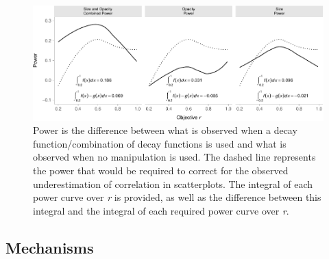 \documentclass[sigconf]{acmart}
\begin{document}
\begin{figure}

{\centering \includegraphics[width=1\textwidth,height=\textheight]{size_and_opacity_files/figure-pdf/fig-power-plot-1.pdf}

}

\caption{\label{fig-power-plot}Power is the difference between what is
observed when a decay function/combination of decay functions is used
and what is observed when no manipulation is used. The dashed line
represents the power that would be required to correct for the observed
underestimation of correlation in scatterplots. The integral of each
power curve over \textit{r} is provided, as well as the difference
between this integral and the integral of each required power curve over
\textit{r}.}

\end{figure}

\hypertarget{sec-mechs}{%
\subsection{Mechanisms}\label{sec-mechs}}
\end{document}
